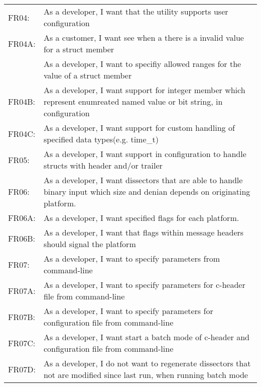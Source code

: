 \begin{table}[ht]
\begin{tabular}{l p{12cm} }
FR04: 	&As a developer, I want that the utility supports user configuration\\
FR04A: 	&As a customer, I want see when a there is a invalid value for a struct member\\
		&As a developer, I want to specifiy allowed ranges for the value of a struct member\\
FR04B:	&As a developer, I want support for integer member which represent enumreated named value or bit string, in configuration\\
FR04C:	&As a developer, I want support for custom handling of specified data types(e.g. time\_t)\\

FR05:		&As a developer, I want support in configuration to handle structs with header and/or trailer\\

FR06:		&As a developer, I want dissectors that are able to handle binary input which size and denian depends on originating platform.\\
FR06A:	&As a developer, I want specified flags for each platform.\\
FR06B:	&As a developer, I want that flags within message headers should signal the platform\\

FR07:		&As a developer, I want to specify parameters from command-line\\
FR07A:	&As a developer, I want to specify parameters for c-header file from command-line\\
FR07B:	&As a developer, I want to specify parameters for configuration file from command-line\\
FR07C:	&As a developer, I want start a batch mode of c-header and configuration file from command-line\\
FR07D:	&As a developer, I do not want to regenerate dissectors that not are modified since last run, when running batch mode\\
\end{tabular}
\end{table}

